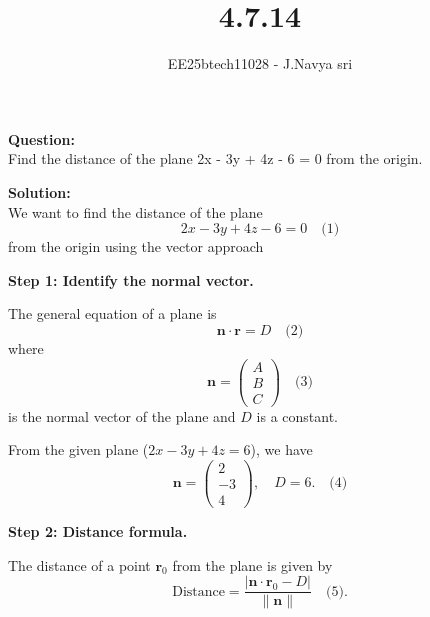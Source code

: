 \documentclass[journal]{IEEEtran}
\begin{document}

\vspace{3cm}

\title{4.7.14}
\author{EE25btech11028 - J.Navya sri}
{\let\newpage\relax\maketitle}


\textbf{Question:} \\
Find the distance of the plane 
2x - 3y + 4z - 6 = 0
from the origin.


\bigskip


\textbf{Solution:} \\
We want to find the distance of the plane 
\begin{equation}
2x - 3y + 4z - 6 = 0 \quad \text{(1)}
\end{equation} 
from the origin using the vector approach

\vspace{0.5em}
\textbf{Step 1: Identify the normal vector.}

The general equation of a plane is 
\begin{equation}
\mathbf{n} \cdot \mathbf{r} = D \quad \text{(2)}
\end{equation}
where 
\begin{equation}
\mathbf{n} = \begin{pmatrix} A \\ B \\ C \end{pmatrix} \quad \text{(3)}
\end{equation} 
is the normal vector of the plane and $D$ is a constant. 

From the given plane ($2x - 3y + 4z = 6$), we have
\begin{equation}
\mathbf{n} = \begin{pmatrix} 2 \\ -3 \\ 4 \end{pmatrix}, \quad D = 6. \quad \text{(4)}
\end{equation}

\vspace{0.5em}
\textbf{Step 2: Distance formula.}

The distance of a point $\mathbf{r}_0$ from the plane is given by
\begin{equation}
\text{Distance} = \frac{|\mathbf{n} \cdot \mathbf{r}_0 - D|}{\|\mathbf{n}\|} \quad \text{(5)}.
\end{equation}
\end{document}
